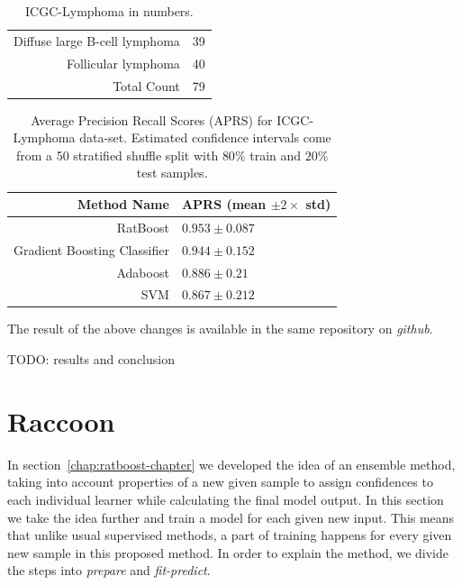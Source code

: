 \begin{table}[!ht]
  \centering
  \begin{tabular}{rc}
    Diffuse large B-cell lymphoma & 39 \\
    Follicular lymphoma & 40 \\
    Total Count & 79 \\
  \end{tabular}
  \caption{ICGC-Lymphoma in numbers.}
  \label{tbl:ratboost2-icgc-lymphoma-dataset}
\end{table}

\begin{table}[!ht]
  \centering
  \begin{tabular}{rl}
    Method Name & APRS (mean $\pm 2 \times$ std) \\ \hline
    RatBoost & $0.953 \pm 0.087$ \\
    Gradient Boosting Classifier & $0.944 \pm 0.152$ \\
    Adaboost & $0.886 \pm 0.21$ \\
    SVM & $0.867 \pm 0.212$ \\ \hline
  \end{tabular}
  \caption{Average Precision Recall Scores (APRS) for ICGC-Lymphoma data-set. Estimated confidence intervals come from a 50 stratified shuffle split with $80\%$ train and $20\%$ test samples.}
  \label{tbl:ratboost2-performance}
\end{table}

The result of the above changes is available in the same repository on \emph{github}.

TODO: results and conclusion

\section{Raccoon}
\label{sec:raccoon}
In section~\ref{chap:ratboost-chapter} we developed the idea of an ensemble method, taking into account properties of a new given sample to assign confidences to each individual learner while calculating the final model output. In this section we take the idea further and train a model for each given new input. This means that unlike usual supervised methods, a part of training happens for every given new sample in this proposed method. In order to explain the method, we divide the steps into \emph{prepare} and \emph{fit-predict}.

